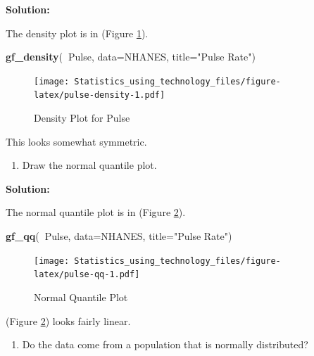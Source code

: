 \documentclass[]{book}
\newenvironment{Shaded}{\begin{snugshade}}{\end{snugshade}}
\newcommand{\DataTypeTok}[1]{\textcolor[rgb]{0.13,0.29,0.53}{#1}}
\newcommand{\KeywordTok}[1]{\textcolor[rgb]{0.13,0.29,0.53}{\textbf{#1}}}
\newcommand{\NormalTok}[1]{#1}
\newcommand{\OperatorTok}[1]{\textcolor[rgb]{0.81,0.36,0.00}{\textbf{#1}}}
\newcommand{\StringTok}[1]{\textcolor[rgb]{0.31,0.60,0.02}{#1}}
\providecommand{\tightlist}{%
  \setlength{\itemsep}{0pt}\setlength{\parskip}{0pt}}
\begin{document}
\textbf{Solution:}

The density plot is in (Figure \ref{fig:pulse-density}).



\begin{Shaded}
\begin{Highlighting}[]
\KeywordTok{gf_density}\NormalTok{(}\OperatorTok{~}\NormalTok{Pulse, }\DataTypeTok{data=}\NormalTok{NHANES, }\DataTypeTok{title=}\StringTok{"Pulse Rate"}\NormalTok{)}
\end{Highlighting}
\end{Shaded}

\begin{figure}
\centering
\texttt{[image: Statistics\_using\_technology\_files/figure-latex/pulse-density-1.pdf]}
\caption{\label{fig:pulse-density}Density Plot for Pulse}
\end{figure}

This looks somewhat symmetric.

\begin{enumerate}
\def\labelenumi{\alph{enumi}.}
\setcounter{enumi}{2}
\tightlist
\item
  Draw the normal quantile plot.
\end{enumerate}

\textbf{Solution:}

The normal quantile plot is in (Figure \ref{fig:pulse-qq}).



\begin{Shaded}
\begin{Highlighting}[]
\KeywordTok{gf_qq}\NormalTok{(}\OperatorTok{~}\NormalTok{Pulse, }\DataTypeTok{data=}\NormalTok{NHANES, }\DataTypeTok{title=}\StringTok{"Pulse Rate"}\NormalTok{)}
\end{Highlighting}
\end{Shaded}

\begin{figure}
\centering
\texttt{[image: Statistics\_using\_technology\_files/figure-latex/pulse-qq-1.pdf]}
\caption{\label{fig:pulse-qq}Normal Quantile Plot}
\end{figure}

(Figure \ref{fig:pulse-qq}) looks fairly linear.

\begin{enumerate}
\def\labelenumi{\alph{enumi}.}
\setcounter{enumi}{4}
\tightlist
\item
  Do the data come from a population that is normally distributed?
\end{enumerate}
\end{document}
